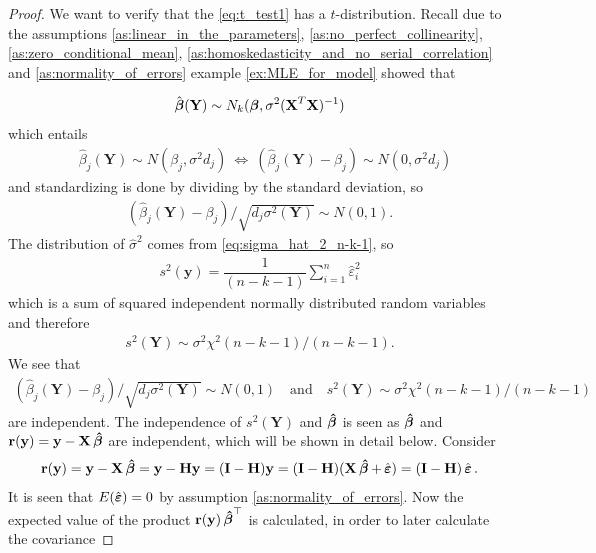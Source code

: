 \begin{proof}
We want to verify that the \eqref{eq:t_test1} has a $t$-distribution. Recall due to the assumptions \ref{as:linear_in_the_parameters}, \ref{as:no_perfect_collinearity}, \ref{as:zero_conditional_mean}, \ref{as:homoskedasticity_and_no_serial_correlation} and \ref{as:normality_of_errors} example \ref{ex:MLE_for_model} showed that

\begin{align} \label{eq:th_t_test}
    \hat{\operatorname{\boldsymbol{\beta}}}(\textbf{Y}) \sim N_k(\operatorname{\boldsymbol{\beta}},\sigma^2(\textbf{X}^T\textbf{X})^{-1})
\end{align}
which entails
\begin{align*}
    &\hat{\beta}_j(\textbf{Y})\sim N(\beta_j , \sigma^2d_j) \
    \Leftrightarrow \  (\hat{\beta}_j(\textbf{Y})-\beta_j) \sim N(0,\sigma^2d_j)
\end{align*}
and standardizing is done by dividing by the standard deviation, so
\begin{align*}
    (\hat{\beta}_j(\textbf{Y})-\beta_j)/\sqrt{d_j\sigma^2(\textbf{Y})} \sim N(0,1).
\end{align*}
The distribution of $\hat{\sigma}^2$ comes from \eqref{eq:sigma_hat_2_n-k-1}, so
\begin{align} \label{eq:sigma_square_of_Y}
    s^2(\textbf{y}) = \dfrac{1}{(n-k-1)}\sum_{i=1}^n \hat{\varepsilon}_i^2
\end{align}
which is a sum of squared independent normally distributed random variables and therefore
\begin{align*}
s^2(\textbf{Y}) \sim \sigma^2 \chi^2(n-k-1)/(n-k-1).    
\end{align*}
We see that
\begin{align*}
    (\hat{\beta}_j(\textbf{Y})-\beta_j)/\sqrt{d_j\sigma^2(\textbf{Y})} \sim N(0,1) \quad \text{and} \quad s^2(\textbf{Y}) \sim \sigma^2\chi^2 (n-k-1)/(n-k-1)
\end{align*}
are independent.
The independence of $s^2(\textbf{Y})$ and $\operatorname{\boldsymbol{\hat{\beta}}}$ is seen as $\operatorname{\boldsymbol{\hat{\beta}}}$ and $\textbf{r}(\textbf{y}) = \textbf{y} -\textbf{X} \operatorname{\boldsymbol{\hat{\beta}}}$ are independent, which will be shown in detail below.
Consider
\begin{align*}
    \textbf{r}(\textbf{y}) = \textbf{y}-\textbf{X} \operatorname{\boldsymbol{\hat{\beta}}} = \textbf{y} - \textbf{H} \textbf{y} = (\textbf{I}-\textbf{H})\textbf{y} = (\textbf{I}-\textbf{H}) (\textbf{X} \operatorname{\boldsymbol{\hat{\beta}}} + \operatorname{\hat{\boldsymbol{\varepsilon}}}) = (\textbf{I} - \textbf{H}) \operatorname{\hat{\boldsymbol{\varepsilon}}}.
\end{align*}
It is seen that $E(\operatorname{\hat{\boldsymbol{\varepsilon}}}) = 0$ by assumption \ref{as:normality_of_errors}. Now the expected value of the product $\textbf{r}(\textbf{y}) \operatorname{\boldsymbol{\hat{\beta}}}^\top$ is calculated, in order to later calculate the covariance

\end{proof}
